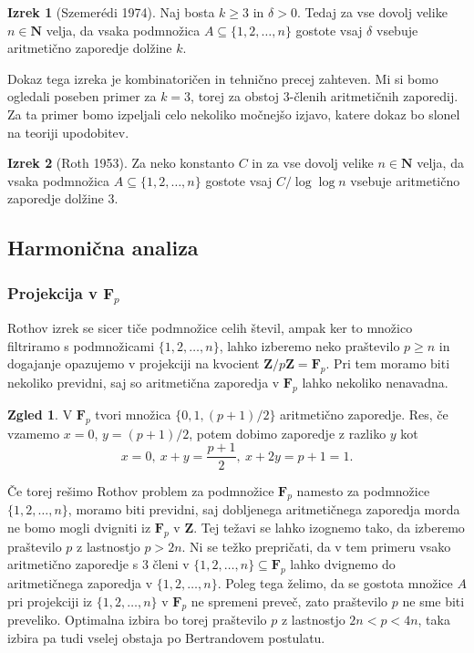 \documentclass[11pt]{book}
\def\NN{\mathbf{N}}
\def\ZZ{\mathbf{Z}}
\def\FF{\mathbf{F}}
\theoremstyle{definition}
\theoremstyle{zgled}
\newtheorem*{zgled}{Zgled}
\theoremstyle{odprtproblem}
\theoremstyle{domacanaloga}
\theoremstyle{izrek}
\newtheorem*{izrek}{Izrek}
\begin{document}
\begin{izrek}[Szemerédi 1974]
Naj bosta $k \geq 3$ in $\delta > 0$. Tedaj za vse dovolj velike $n \in \NN$ velja, da vsaka podmnožica $A \subseteq \{ 1, 2, \dots, n \}$ gostote vsaj $\delta$ vsebuje aritmetično zaporedje dolžine $k$.
\end{izrek}

Dokaz tega izreka je kombinatoričen in tehnično precej zahteven. Mi si bomo ogledali poseben primer za $k = 3$, torej za obstoj $3$-členih aritmetičnih zaporedij. Za ta primer bomo izpeljali celo nekoliko močnejšo izjavo, katere dokaz bo slonel na teoriji upodobitev.

\begin{izrek}[Roth 1953]
Za neko konstanto $C$ in za vse dovolj velike $n \in \NN$ velja, da vsaka podmnožica $A \subseteq \{ 1, 2, \dots, n \}$ gostote vsaj $C/\log \log n$ vsebuje aritmetično zaporedje dolžine $3$.
\end{izrek}

\subsection{Harmonična analiza}

\subsubsection{Projekcija v $\FF_p$}

Rothov izrek se sicer tiče podmnožice celih števil, ampak ker to množico filtriramo s podmnožicami $\{1,2,\dots,n\}$, lahko izberemo neko praštevilo $p \geq n$ in dogajanje opazujemo v projekciji na kvocient $\ZZ/p\ZZ = \FF_p$. Pri tem moramo biti nekoliko previdni, saj so aritmetična zaporedja v $\FF_p$ lahko nekoliko nenavadna.

\begin{zgled}
V $\FF_p$ tvori množica $\{ 0, 1, (p+1)/2 \}$ aritmetično zaporedje. Res, če vzamemo $x = 0$, $y = (p+1)/2$, potem dobimo zaporedje z razliko $y$ kot
\[
    x = 0, \ x + y = \frac{p+1}{2}, \ x + 2y = p + 1 = 1.
\]
\end{zgled}

Če torej rešimo Rothov problem za podmnožice $\FF_p$ namesto za podmnožice $\{1,2,\dots,n\}$, moramo biti previdni, saj dobljenega aritmetičnega zaporedja morda ne bomo mogli dvigniti iz $\FF_p$ v $\ZZ$. Tej težavi se lahko izognemo tako, da izberemo praštevilo $p$ z lastnostjo $p > 2n$. Ni se težko prepričati, da v tem primeru vsako aritmetično zaporedje s $3$ členi v $\{ 1, 2, \dots, n \} \subseteq \FF_p$ lahko dvignemo do aritmetičnega zaporedja v $\{1,2,\dots,n\}$. Poleg tega želimo, da se gostota množice $A$ pri projekciji iz $\{1,2,\dots,n \}$ v $\FF_p$ ne spremeni preveč, zato praštevilo $p$ ne sme biti preveliko. Optimalna izbira bo torej praštevilo $p$ z lastnostjo $2n < p < 4n$, taka izbira pa tudi vselej obstaja po Bertrandovem postulatu.
\end{document}
